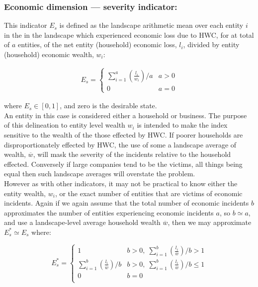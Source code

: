 \documentclass[fleqn,10pt]{olplainarticle}
\begin{document}
\subsubsection*{Economic dimension --- severity indicator:}
This indicator $E_s$ is defined as the landscape arithmetic mean over each entity $i$ in the in the landscape which experienced economic loss due to HWC, for at total of $a$ entities, of the net entity (household) economic loss, $l_i$, divided by entity (household) economic wealth, $w_i$:

\begin{align*}
    E_s = \begin{cases}
        \sum_{i=1}^{a}(\frac{l_i}{w_i})/a & a > 0 \\
        0                                     & a = 0
    \end{cases}
\end{align*}

where $E_s \in [0,1]$, and zero is the desirable state. \\ 

An entity in this case is considered either a household or business. The purpose of this delineation to entity level wealth $w_i$ is intended to make the index sensitive to the wealth of the those effected by HWC. If poorer households are disproportionately effected by HWC, the use of some a landscape average of wealth, $\overline{w}$, will mask the severity of the incidents relative to the household effected. Conversely if large companies tend to be the victims, all things being equal then such landscape averages will overstate the problem. \\

However as with other indicators, it may not be practical to know either the entity wealth, $w_i$, or the exact number of entities that are victims of economic incidents. Again if we again assume  that the total number of economic incidents $b$ approximates the number of entities experiencing economic incidents $a$, so $b \simeq a$, and use a landscape-level average household wealth $\overline{w}$, then we may approximate $E_s^\ast \simeq E_s$ where:

\begin{equation*}
    E_s^\ast = \begin{cases}
    1                   & b > 0,\; \sum_{i=1}^{b}(\frac{l_i}{\overline{w}})/b > 1\\
    \sum_{i=1}^{b}(\frac{l_i}{\overline{w}})/b & b > 0,\; \sum_{i=1}^{b}(\frac{l_i}{\overline{w}})/b \le 1 \\
    0                   & b = 0 \\
    \end{cases}
\end{equation*}
\end{document}
